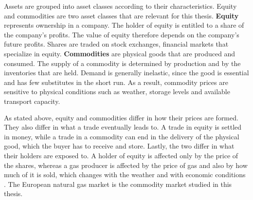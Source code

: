Assets are grouped into asset classes according to their characteristics. Equity and commodities are two asset classes that are relevant for this thesis. \textbf{Equity} represents ownership in a company. The holder of equity is entitled to a share of the company's profits. The value of equity therefore depends on the company's future profits. Shares are traded on stock exchanges, financial markets that specialize in equity. \textbf{Commodities} are physical goods that are produced and consumed. The supply of a commodity is determined by production and by the inventories that are held. Demand is generally inelastic, since the good is essential and has few substitutes in the short run. As a result, commodity prices are sensitive to physical conditions such as weather, storage levels and available transport capacity.

As stated above, equity and commodities differ in how their prices are formed. They also differ in what a trade eventually leads to. A trade in equity is settled in money, while a trade in a commodity can end in the delivery of the physical good, which the buyer has to receive and store. Lastly, the two differ in what their holders are exposed to. A holder of equity is affected only by the price of the shares, whereas a gas producer is affected by the price of gas and also by how much of it is sold, which changes with the weather and with economic conditions \parencite{gemanCommoditiesCommodityDerivatives2006}. The European natural gas market is the commodity market studied in this thesis.